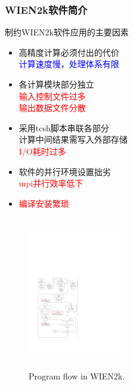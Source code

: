 \documentclass[cjk,slidestop,compress,mathserif,blue]{beamer}
\begin{document}
\frame
{
	\frametitle{\textrm{WIEN2k}软件简介}
\begin{minipage}[t]{0.55\textwidth}
	制约\textrm{WIEN2k}软件应用的主要因素
	\begin{itemize}
		\item 高精度计算必须付出的代价\\
			\textcolor{blue}{计算速度慢，处理体系有限}
		\item 各计算模块部分独立\\
			\textcolor{red}{输入控制文件过多}\\
			\textcolor{red}{输出数据文件分散}
		\item 采用\textrm{tcsh}脚本串联各部分\\
			计算中间结果需写入外部存储\\
			\textcolor{red}{\textrm{I/O}耗时过多}
		\item 软件的并行环境设置拙劣\\
			\textcolor{red}{\textrm{mpi}并行效率低下}
		\item \textcolor{red}{编译安装繁琐}
	\end{itemize}
\end{minipage}
\hfill
\begin{minipage}[t]{0.43\textwidth}
\begin{figure}[h!]
\centering
\vspace*{-10pt}
\includegraphics[height=2.6in,width=1.60in,viewport=60 90 325 500,clip]{Figures/WIEN2k_Program_flow.pdf}
\caption{\tiny \textrm{Program flow in WIEN2k.}}%
\label{WIEN2k_program_flow}
\end{figure}
\end{minipage}
}

\section*{}
\end{document}
